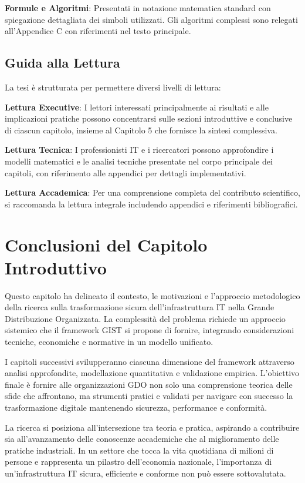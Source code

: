 \begin{bibunit}[IEEEtran]
\textbf{Formule e Algoritmi}: Presentati in notazione matematica standard con spiegazione dettagliata dei simboli utilizzati. Gli algoritmi complessi sono relegati all'Appendice C con riferimenti nel testo principale.

\subsection{Guida alla Lettura}

La tesi è strutturata per permettere diversi livelli di lettura:

\textbf{Lettura Executive}: I lettori interessati principalmente ai risultati e alle implicazioni pratiche possono concentrarsi sulle sezioni introduttive e conclusive di ciascun capitolo, insieme al Capitolo 5 che fornisce la sintesi complessiva.

\textbf{Lettura Tecnica}: I professionisti IT e i ricercatori possono approfondire i modelli matematici e le analisi tecniche presentate nel corpo principale dei capitoli, con riferimento alle appendici per dettagli implementativi.

\textbf{Lettura Accademica}: Per una comprensione completa del contributo scientifico, si raccomanda la lettura integrale includendo appendici e riferimenti bibliografici.

\section{Conclusioni del Capitolo Introduttivo}

Questo capitolo ha delineato il contesto, le motivazioni e l'approccio metodologico della ricerca sulla trasformazione sicura dell'infrastruttura IT nella Grande Distribuzione Organizzata. La complessità del problema richiede un approccio sistemico che il framework GIST si propone di fornire, integrando considerazioni tecniche, economiche e normative in un modello unificato.

I capitoli successivi svilupperanno ciascuna dimensione del framework attraverso analisi approfondite, modellazione quantitativa e validazione empirica. L'obiettivo finale è fornire alle organizzazioni GDO non solo una comprensione teorica delle sfide che affrontano, ma strumenti pratici e validati per navigare con successo la trasformazione digitale mantenendo sicurezza, performance e conformità.

La ricerca si posiziona all'intersezione tra teoria e pratica, aspirando a contribuire sia all'avanzamento delle conoscenze accademiche che al miglioramento delle pratiche industriali. In un settore che tocca la vita quotidiana di milioni di persone e rappresenta un pilastro dell'economia nazionale, l'importanza di un'infrastruttura IT sicura, efficiente e conforme non può essere sottovalutata.


\end{bibunit}
